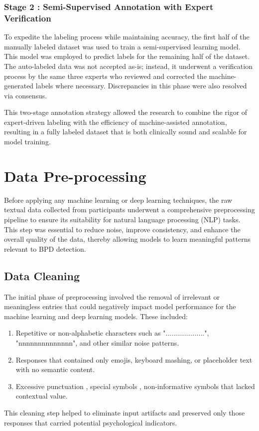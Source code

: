 \subsubsection{Stage 2 : Semi-Supervised Annotation with Expert Verification}
To expedite the labeling process while maintaining accuracy, the first half of the manually labeled dataset was used to train a semi-supervised learning model. This model was employed to predict labels for the remaining half of the dataset. The auto-labeled data was not accepted as-is; instead, it underwent a verification process by the same three experts who reviewed and corrected the machine-generated labels where necessary. Discrepancies in this phase were also resolved via consensus.

This two-stage annotation strategy allowed the research to combine the rigor of expert-driven labeling with the efficiency of machine-assisted annotation, resulting in a fully labeled dataset that is both clinically sound and scalable for model training.

\section{Data Pre-processing}
Before applying any machine learning or deep learning techniques, the raw textual data collected from participants underwent a comprehensive preprocessing pipeline to ensure its suitability for natural language processing (NLP) tasks. This step was essential to reduce noise, improve consistency, and enhance the overall quality of the data, thereby allowing models to learn meaningful patterns relevant to BPD detection.

\subsection{Data Cleaning}
The initial phase of preprocessing involved the removal of irrelevant or meaningless entries that could negatively impact model performance for the machine learning and deep learning models. These included:
\begin{enumerate}
    \item Repetitive or non-alphabetic characters such as "....................", "nnnnnnnnnnnnnn", and other similar noise patterns.

     \item Responses that contained only emojis, keyboard mashing, or placeholder text with no semantic content.

    \item Excessive punctuation , special symbols , non-informative symbols that lacked contextual value.
\end{enumerate}
This cleaning step helped to eliminate input artifacts and preserved only those responses that carried potential psychological indicators.

